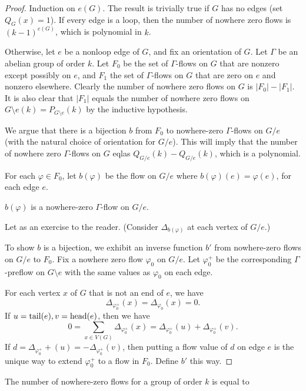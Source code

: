 \documentclass[main.tex]{subfiles}
\begin{document}
\begin{proof}
  Induction on $e(G)$.
  The result is trivially true if $G$ has no edges (set $Q_G(x) = 1$).
  If every edge is a loop, then the number of nowhere zero flows is
  $(k-1)^{e(G)}$, which is polynomial in $k$.

  Otherwise, let $e$ be a nonloop edge of $G$, and fix an orientation of $G$.
  Let $\Gamma$ be an abelian group of order $k$.
  Let $F_0$ be the set of $\Gamma$-flows on $G$ that are nonzero except possibly on $e$,
  and $F_1$ the set of $\Gamma$-flows on $G$ that are zero on $e$ and nonzero
  elsewhere.
  Clearly the number of nowhere zero flows on $G$ is $|F_0| - |F_1|$.
  It is also clear that $|F_1|$ equals the number of nowhere zero flows on
  $G\setminus e(k) = P_{G\setminus e}(k)$ by the inductive hypothesis.

  We argue that there is a bijection $b$ from $F_0$ to nowhere-zero
  $\Gamma$-flows on $G/e$ (with the natural choice of orientation for $G/e$).
  This will imply that the number of nowhere zero $\Gamma$-flows on $G$ eqlas
  $Q_{G/e}(k) - Q_{G/e}(k)$, which is a polynomial.

  For each $\varphi\in F_0$, let $b(\varphi)$ be the flow on $G/e$ where
  $b(\varphi)(e) = \varphi(e)$, for each edge $e$.
  \begin{claim}
    $b(\varphi)$ is a nowhere-zero $\Gamma$-flow on $G/e$.
  \end{claim}
  \begin{subproof}
    Let as an exercise to the reader.
    (Consider $\Delta_{b(\varphi)}$ at each vertex of $G/e$.)
  \end{subproof}
  To show $b$ is a bijection, we exhibit an inverse function $b'$ from
  nowhere-zero flows on $G/e$ to $F_0$.
  Fix a nowhere zero flow $\varphi_0$ on $G/e$.
  Let $\varphi_0^+$ be the corresponding $\Gamma$-preflow on $G\setminus e$
  with the same values as $\varphi_0$ on each edge.

  For each vertex $x$ of $G$ that is not an end of $e$, we have
  \[
    \Delta_{\varphi_0^+}(x) = \Delta_{\varphi_0}(x) = 0.
  \]
  If $u = \operatorname{tail}(e), v = \operatorname{head}(e)$, then we have
  \[
    0 = \sum_{x\in V(G)}\Delta_{\varphi_0^+}(x)
    = \Delta_{\varphi_0^+}(u) + \Delta_{\varphi_0^+}(v).
  \]
  If $d = \Delta_{\varphi_0^+}+(u) = -\Delta_{\varphi_0^+}(v)$, then putting a
  flow value of $d$ on edge $e$ is the unique way to extend $\varphi_0^+$ to a
  flow in $F_0$.
  Define $b'$ this way.
\end{proof}
The number of nowhere-zero flows for a group of order $k$ is equal to
\end{document}
